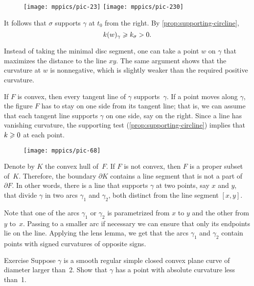 {

\begin{wrapfigure}{o}{50 mm}
\vskip-2mm
\centering
\texttt{[image: mppics/pic-23]}
\bigskip
\texttt{[image: mppics/pic-230]}
\end{wrapfigure}

It follows that $\sigma$ supports $\gamma$ at $t_0$ from the right.
By \ref{prop:supporting-circline}, 
\[k(w)_\gamma\geqslant k_\sigma >0.\]
\qedsf

Instead of taking the minimal disc segment, one can take a point $w$ on $\gamma$ that maximizes the distance to the line $xy$.
The same argument shows that the curvature at $w$ is nonnegative, which is slightly weaker than the required positive curvature.

}

If $F$ is convex, then every tangent line of $\gamma$ supports~$\gamma$.
If a point moves along $\gamma$, the figure $F$ has to stay on one side from its tangent line;
that is, we can assume that each tangent line supports $\gamma$ on one side, say on the right.
Since a line has vanishing curvature, the supporting test (\ref{prop:supporting-circline}) implies that $k\geqslant 0$ at each point.

\begin{wrapfigure}{r}{35 mm}
\vskip-3mm
\centering
\texttt{[image: mppics/pic-68]}
\vskip0mm
\end{wrapfigure}

Denote by $K$ the convex hull of~$F$.
If $F$ is not convex, then $F$ is a proper subset of~$K$.
Therefore, the boundary $\partial K$ contains a line segment that is not a part of $\partial F$.
In other words, there is a line that supports $\gamma$ at two points, say $x$ and $y$, that divide $\gamma$ in two arcs $\gamma_1$ and $\gamma_2$, both distinct from the line segment $[x,y]$.

Note that one of the arcs $\gamma_1$ or $\gamma_2$ is parametrized from $x$ to $y$ and the other from $y$ to~$x$.
Passing to a smaller arc if necessary we can ensure that only its endpoints lie on the line. 
Applying the lens lemma, we get that the arcs $\gamma_1$ and $\gamma_2$ contain points with signed curvatures of opposite signs.
\qeds

\begin{thm}{Exercise}\label{ex:convex small}
Suppose $\gamma$ is a smooth regular simple closed convex plane curve of diameter larger than~2.
Show that $\gamma$ has a point with absolute curvature less than~1.
\end{thm}


